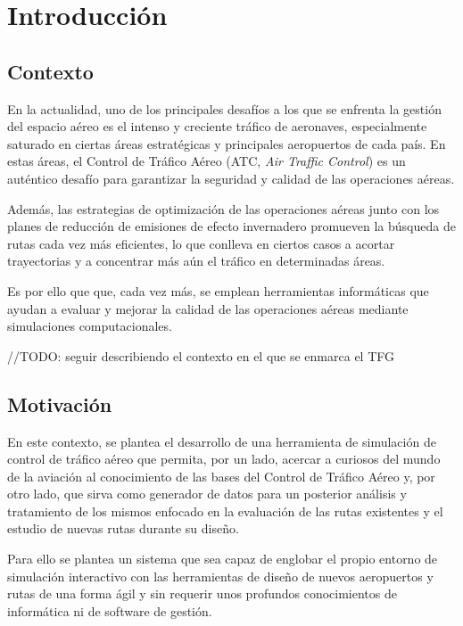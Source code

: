\chapter{Introducción}
\label{sec:intro}


\section{Contexto}
\label{sec:contexto}

En la actualidad, uno de los principales desafíos a los que se enfrenta la gestión del espacio aéreo es el intenso y creciente tráfico de aeronaves, especialmente saturado en ciertas áreas estratégicas y principales aeropuertos de cada país. En estas áreas, el Control de Tráfico Aéreo (ATC, \textit{Air Traffic Control}) es un auténtico desafío para garantizar la seguridad y calidad de las operaciones aéreas.

Además, las estrategias de optimización de las operaciones aéreas junto con los planes de reducción de emisiones de efecto invernadero promueven la búsqueda de rutas cada vez más eficientes, lo que conlleva en ciertos casos a acortar trayectorias y a concentrar más aún el tráfico en determinadas áreas.

Es por ello que que, cada vez más, se emplean herramientas informáticas que ayudan a evaluar y mejorar la calidad de las operaciones aéreas mediante simulaciones computacionales.

//TODO: seguir describiendo el contexto en el que se enmarca el TFG

\newpage

\section{Motivación}
\label{sec:motivación}

En este contexto, se plantea el desarrollo de una herramienta de simulación de control de tráfico aéreo que permita, por un lado, acercar a curiosos del mundo de la aviación al conocimiento de las bases del Control de Tráfico Aéreo y, por otro lado, que sirva como generador de datos para un posterior análisis y tratamiento de los mismos enfocado en la evaluación de las rutas existentes y el estudio de nuevas rutas durante su diseño.

Para ello se plantea un sistema que sea capaz de englobar el propio entorno de simulación interactivo con las herramientas de diseño de nuevos aeropuertos y rutas de una forma ágil y sin requerir unos profundos conocimientos de informática ni de software de gestión.

